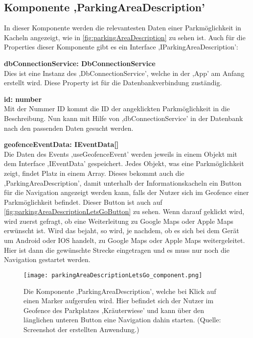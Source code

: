 \subsection{Komponente ,ParkingAreaDescription'}
\label{handleFunctions}
In dieser Komponente werden die relevantesten Daten einer Parkmöglichkeit in Kacheln angezeigt, wie in \autoref{fig:parkingAreaDescription} zu sehen ist. Auch für die Properties dieser Komponente gibt es ein Interface ,IParkingAreaDescription':
\begin{description}
	\item \textbf{dbConnectionService: DbConnectionService} \\ Dies ist eine Instanz des ,DbConnectionService', welche in der ,App' am Anfang erstellt wird. Diese Property ist für die Datenbankverbindung zuständig.
	\item \textbf{id: number} \\ Mit der Nummer ID kommt die ID der angeklickten Parkmöglichkeit in die Beschreibung. Nun kann mit Hilfe von ,dbConnectionService' in der Datenbank nach den passenden Daten gesucht werden.
	\item \textbf{geofenceEventData: IEventData[]} \\ Die Daten des Events ,useGeofenceEvent' werden jeweils in einem Objekt mit dem Interface ,IEventData' gespeichert. Jedes Objekt, was eine Parkmöglichkeit zeigt, findet Platz in einem Array. Dieses bekommt auch die ,ParkingAreaDescription', damit unterhalb der Informationskacheln ein Button für die Navigation angezeigt werden kann, falls der Nutzer sich im Geofence einer Parkmöglichkeit befindet. Dieser Button ist auch auf \autoref{fig:parkingAreaDescriptionLetsGoButton} zu sehen. Wenn darauf geklickt wird, wird zuerst gefragt, ob eine Weiterleitung zu Google Maps oder Apple Maps erwünscht ist. Wird das bejaht, so wird, je nachdem, ob es sich bei dem Gerät um Android oder IOS handelt, zu Google Maps oder Apple Maps weitergeleitet. Hier ist dann die gewünschte Strecke eingetragen und es muss nur noch die Navigation gestartet werden.
	\begin{figure}[h!]
		\centering
		\texttt{[image: parkingAreaDescriptionLetsGo\_component.png]}
		\caption[Die Komponente ,ParkingAreaDescription', welche bei Klick auf einen Marker aufgerufen wird.]
		{Die Komponente ,ParkingAreaDescription', welche bei Klick auf einen Marker aufgerufen wird. Hier befindet sich der Nutzer im Geofence des Parkplatzes ,Kräuterwiese' und kann über den länglichen unteren Button eine Navigation dahin starten. (Quelle: Screenshot der erstellten Anwendung.)}

\end{figure}
\end{description}
